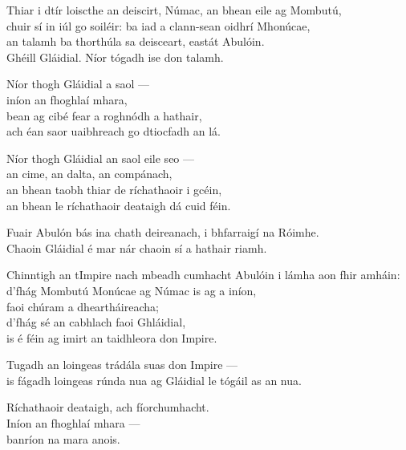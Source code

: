 \begin{lyrics}
Thiar i dtír loiscthe an deiscirt, Númac, an bhean eile ag Mombutú,\\
chuir sí in iúl go soiléir: ba iad a clann-sean oidhrí Mhonúcae,\\
an talamh ba thorthúla sa deisceart, eastát Abulóin.\\
Ghéill Gláidial. Níor tógadh ise don talamh.

Níor thogh Gláidial a saol —\\
iníon an fhoghlaí mhara,\\
bean ag cibé fear a roghnódh a hathair,\\
ach éan saor uaibhreach go dtiocfadh an lá.

Níor thogh Gláidial an saol eile seo —\\
an cime, an dalta, an compánach,\\
an bhean taobh thiar de ríchathaoir i gcéin,\\
an bhean le ríchathaoir deataigh dá cuid féin.

Fuair Abulón bás ina chath deireanach, i bhfarraigí na Róimhe.\\
Chaoin Gláidial é mar nár chaoin sí a hathair riamh.

Chinntigh an tImpire nach mbeadh cumhacht Abulóin i lámha aon fhir amháin:\\
d'fhág Mombutú Monúcae ag Númac is ag a iníon,\\
faoi chúram a dheartháireacha;\\
d'fhág sé an cabhlach faoi Ghláidial,\\
is é féin ag imirt an taidhleora don Impire.

Tugadh an loingeas trádála suas don Impire —\\
is fágadh loingeas rúnda nua ag Gláidial le tógáil as an nua.

Ríchathaoir deataigh, ach fíorchumhacht.\\
Iníon an fhoghlaí mhara —\\
banríon na mara anois.
\end{lyrics}

